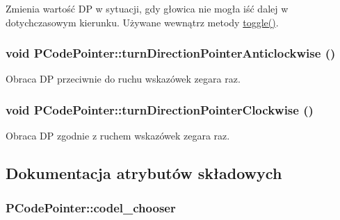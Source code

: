 Zmienia wartość DP w sytuacji, gdy głowica nie mogła iść dalej w dotychczasowym kierunku. Używane wewnątrz metody \hyperlink{classPCodePointer_5b34ab0f6bb3ddb3bd7e44a7d9a613ca}{toggle()}. \hypertarget{classPCodePointer_3f43e8205a0554bf7baa3821e01ab4a2}{
\subsubsection[{turnDirectionPointerAnticlockwise}]{\setlength{\rightskip}{0pt plus 5cm}void PCodePointer::turnDirectionPointerAnticlockwise ()}}
\label{classPCodePointer_3f43e8205a0554bf7baa3821e01ab4a2}


Obraca DP przeciwnie do ruchu wskazówek zegara raz. \hypertarget{classPCodePointer_a3ad29e6327d54faf0b081892e720aca}{
\subsubsection[{turnDirectionPointerClockwise}]{\setlength{\rightskip}{0pt plus 5cm}void PCodePointer::turnDirectionPointerClockwise ()}}
\label{classPCodePointer_a3ad29e6327d54faf0b081892e720aca}


Obraca DP zgodnie z ruchem wskazówek zegara raz. 

\subsection{Dokumentacja atrybutów składowych}
\hypertarget{classPCodePointer_a3d7ea2563c9e1363ddcb0fb19b35f5a}{
\subsubsection[{codel\_\-chooser}]{ {\bf PCodePointer::codel\_\-chooser}}}
\label{classPCodePointer_a3d7ea2563c9e1363ddcb0fb19b35f5a}


